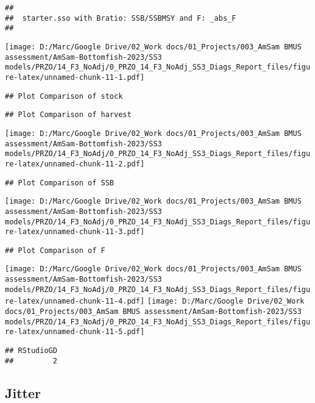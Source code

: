 \documentclass[
]{article}
\begin{document}
\begin{verbatim}
## 
##  starter.sso with Bratio: SSB/SSBMSY and F: _abs_F 
## 
\end{verbatim}

\texttt{[image: D:/Marc/Google Drive/02\_Work docs/01\_Projects/003\_AmSam BMUS assessment/AmSam-Bottomfish-2023/SS3 models/PRZO/14\_F3\_NoAdj/0\_PRZO\_14\_F3\_NoAdj\_SS3\_Diags\_Report\_files/figure-latex/unnamed-chunk-11-1.pdf]}

\begin{verbatim}
## Plot Comparison of stock
\end{verbatim}

\begin{verbatim}
## Plot Comparison of harvest
\end{verbatim}

\texttt{[image: D:/Marc/Google Drive/02\_Work docs/01\_Projects/003\_AmSam BMUS assessment/AmSam-Bottomfish-2023/SS3 models/PRZO/14\_F3\_NoAdj/0\_PRZO\_14\_F3\_NoAdj\_SS3\_Diags\_Report\_files/figure-latex/unnamed-chunk-11-2.pdf]}

\begin{verbatim}
## Plot Comparison of SSB
\end{verbatim}

\texttt{[image: D:/Marc/Google Drive/02\_Work docs/01\_Projects/003\_AmSam BMUS assessment/AmSam-Bottomfish-2023/SS3 models/PRZO/14\_F3\_NoAdj/0\_PRZO\_14\_F3\_NoAdj\_SS3\_Diags\_Report\_files/figure-latex/unnamed-chunk-11-3.pdf]}

\begin{verbatim}
## Plot Comparison of F
\end{verbatim}

\texttt{[image: D:/Marc/Google Drive/02\_Work docs/01\_Projects/003\_AmSam BMUS assessment/AmSam-Bottomfish-2023/SS3 models/PRZO/14\_F3\_NoAdj/0\_PRZO\_14\_F3\_NoAdj\_SS3\_Diags\_Report\_files/figure-latex/unnamed-chunk-11-4.pdf]}
\texttt{[image: D:/Marc/Google Drive/02\_Work docs/01\_Projects/003\_AmSam BMUS assessment/AmSam-Bottomfish-2023/SS3 models/PRZO/14\_F3\_NoAdj/0\_PRZO\_14\_F3\_NoAdj\_SS3\_Diags\_Report\_files/figure-latex/unnamed-chunk-11-5.pdf]}

\begin{verbatim}
## RStudioGD 
##         2
\end{verbatim}

\hypertarget{jitter}{%
\subsection{Jitter}\label{jitter}}
\end{document}
